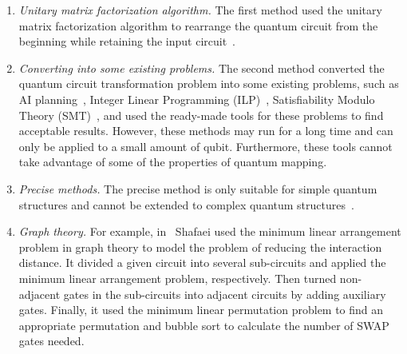 \documentclass[runningheads]{llncs}
\begin{document}
\begin{enumerate}
	\item \emph{Unitary matrix factorization algorithm.} The first method used the unitary matrix factorization algorithm to rearrange the quantum circuit from the beginning while retaining the input circuit~\cite{2019CNOT,2019Quantum}.
	\item \emph{Converting into some existing problems.} The second method converted the quantum circuit transformation problem into some existing problems, such as AI planning~\cite{2017Temporal,2018Integer}, Integer Linear Programming (ILP)~\cite{2019Almeida}, Satisfiability Modulo Theory (SMT)~\cite{2019Murali}, and used the ready-made tools for these problems to find acceptable results. However, these methods may run for a long time and can only be applied to a small amount of qubit. Furthermore, these tools cannot take advantage of some of the properties of quantum mapping.
	\item \emph{Precise methods.} 
	The precise method is only suitable for simple quantum structures and cannot be extended to complex quantum structures~\cite{2018QubitSiraichi}.
	\item \emph{Graph theory.} 
	For example, in~\cite{Shafaei2013} Shafaei used the minimum linear arrangement problem in graph theory to model the problem of reducing the interaction distance. It divided a given circuit into several sub-circuits and applied the minimum linear arrangement problem, respectively. Then turned non-adjacent gates in the sub-circuits into adjacent circuits by adding auxiliary gates. Finally, it used the minimum linear permutation problem to find an appropriate permutation and bubble sort to calculate the number of SWAP gates needed.
   

\end{enumerate}
\end{document}
